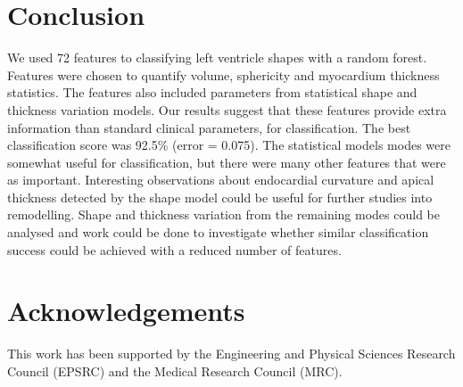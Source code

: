 \documentclass{llncs}
\begin{document}
\section{Conclusion}
We used 72 features to classifying left ventricle shapes with a random forest. Features were chosen to quantify volume, sphericity and myocardium thickness statistics. The features also included parameters from statistical shape and thickness variation models. Our results suggest that these features provide extra information than standard clinical parameters, for classification. The best classification score was 92.5\% (error = 0.075). 
The statistical models modes were somewhat useful for classification, but there were many other features that were as important. Interesting observations about endocardial curvature and apical thickness detected by the shape model could be useful for further studies into remodelling. Shape and thickness variation from the remaining modes could be analysed and work could be done to investigate whether similar classification success could be achieved with a reduced number of features.
\section{Acknowledgements}
This work has been supported by the Engineering and Physical Sciences Research Council (EPSRC) and the Medical Research Council (MRC).


\end{document}
